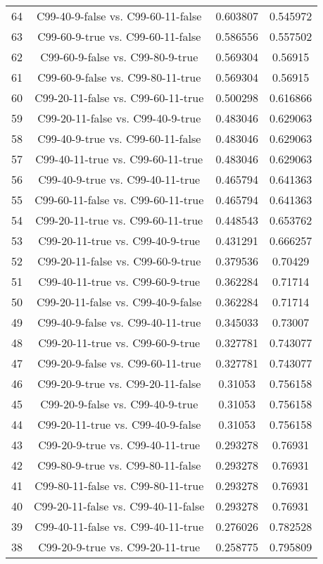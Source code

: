 \documentclass[a4paper,10pt]{article}
\begin{document}
\begin{landscape}
\begin{table}[!htp]
\begin{tabular}{cccc}
64&C99-40-9-false vs. C99-60-11-false&0.603807&0.545972\\
63&C99-60-9-true vs. C99-60-11-false&0.586556&0.557502\\
62&C99-60-9-false vs. C99-80-9-true&0.569304&0.56915\\
61&C99-60-9-false vs. C99-80-11-true&0.569304&0.56915\\
60&C99-20-11-false vs. C99-60-11-true&0.500298&0.616866\\
59&C99-20-11-false vs. C99-40-9-true&0.483046&0.629063\\
58&C99-40-9-true vs. C99-60-11-false&0.483046&0.629063\\
57&C99-40-11-true vs. C99-60-11-true&0.483046&0.629063\\
56&C99-40-9-true vs. C99-40-11-true&0.465794&0.641363\\
55&C99-60-11-false vs. C99-60-11-true&0.465794&0.641363\\
54&C99-20-11-true vs. C99-60-11-true&0.448543&0.653762\\
53&C99-20-11-true vs. C99-40-9-true&0.431291&0.666257\\
52&C99-20-11-false vs. C99-60-9-true&0.379536&0.70429\\
51&C99-40-11-true vs. C99-60-9-true&0.362284&0.71714\\
50&C99-20-11-false vs. C99-40-9-false&0.362284&0.71714\\
49&C99-40-9-false vs. C99-40-11-true&0.345033&0.73007\\
48&C99-20-11-true vs. C99-60-9-true&0.327781&0.743077\\
47&C99-20-9-false vs. C99-60-11-true&0.327781&0.743077\\
46&C99-20-9-true vs. C99-20-11-false&0.31053&0.756158\\
45&C99-20-9-false vs. C99-40-9-true&0.31053&0.756158\\
44&C99-20-11-true vs. C99-40-9-false&0.31053&0.756158\\
43&C99-20-9-true vs. C99-40-11-true&0.293278&0.76931\\
42&C99-80-9-true vs. C99-80-11-false&0.293278&0.76931\\
41&C99-80-11-false vs. C99-80-11-true&0.293278&0.76931\\
40&C99-20-11-false vs. C99-40-11-false&0.293278&0.76931\\
39&C99-40-11-false vs. C99-40-11-true&0.276026&0.782528\\
38&C99-20-9-true vs. C99-20-11-true&0.258775&0.795809\\

\end{tabular}
\end{table}
\end{landscape}
\end{document}
